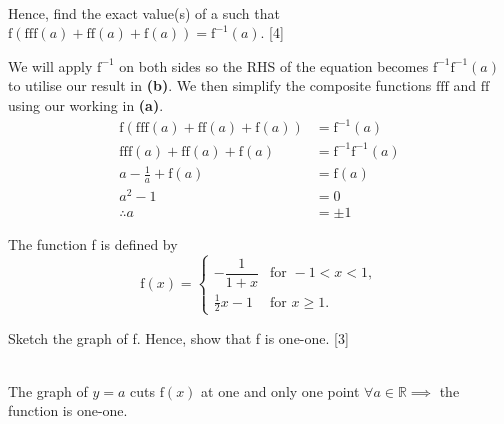 \documentclass[12pt, a4 paper]{article}
\begin{document}
\begin{outline}[enumerate]
\begin{answer}
\begin{align*}
		\end{align*}
	\end{answer}
	\2 Hence, find the exact value(s) of a such that $\textrm{f}(\textrm{f}\textrm{f}\textrm{f}(a)+\textrm{f}\textrm{f}(a)+\textrm{f}(a))=\textrm{f}^{-1}(a)$. \hfill[4]
	\begin{answer}
		We will apply $\textrm{f}^{-1}$ on both sides so the RHS of the equation becomes $\textrm{f}^{-1}\textrm{f}^{-1}(a)$ to utilise our result in \textbf{(b)}. We then simplify the composite functions $\textrm{f}\textrm{f}\textrm{f}$ and $\textrm{f}\textrm{f}$ using our working in \textbf{(a)}.
		\begin{align*}
			\textrm{f}(\textrm{f}\textrm{f}\textrm{f}(a)+\textrm{f}\textrm{f}(a)+\textrm{f}(a)) & =\textrm{f}^{-1}(a)                \\
			\textrm{f}\textrm{f}\textrm{f}(a)+\textrm{f}\textrm{f}(a)+\textrm{f}(a)             & =\textrm{f}^{-1}\textrm{f}^{-1}(a) \\
			a-\frac{1}{a}+\textrm{f}(a)                                                         & =\textrm{f}(a)                     \\
			a^2-1                                                                               & =0                                 \\
			\therefore a                                                                        & =\pm 1                             
		\end{align*}
	\end{answer}
		    
	\1 The function f is defined by 
	\[\textrm{f}(x)=
		\begin{cases}        
			-\dfrac{1}{1+x} & \textrm{for }-1<x<1, \\
			\frac{1}{2}x-1  & \textrm{for }x\geq1. 
		\end{cases}   
	\] %
				
	\2 Sketch the graph of f. Hence, show that f is one-one. \hfill[3]
	\begin{answer}
		\vspace{3mm}
		\color{black}
		\\
		\color{blue}
		The graph of $y=a$ cuts $\textrm{f}(x)$ at one and only one point $\forall a\in\mathbb{R}\implies$ the function is one-one.
	\end{answer}
				

\end{outline}
\end{document}
